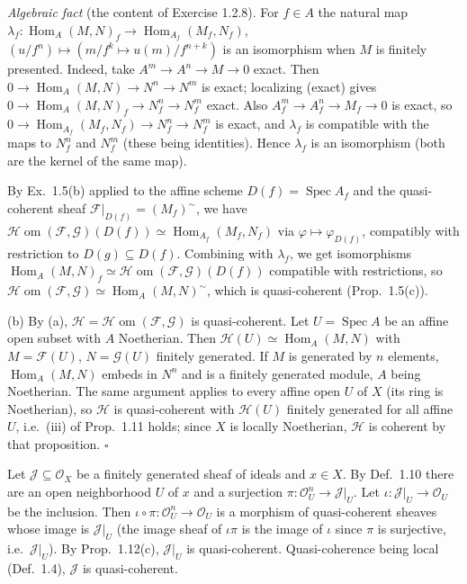 \documentclass[11pt]{article}
\begin{document}
\emph{Algebraic fact} (the content of Exercise 1.2.8). For $f\in A$ the natural map $\lambda_f:\operatorname{Hom}_A(M,N)_f\to\operatorname{Hom}_{A_f}(M_f,N_f)$, $(u/f^n)\mapsto(m/f^k\mapsto u(m)/f^{n+k})$ is an isomorphism when $M$ is finitely presented. Indeed, take $A^m\to A^n\to M\to0$ exact. Then $0\to\operatorname{Hom}_A(M,N)\to N^n\to N^m$ is exact; localizing (exact) gives $0\to\operatorname{Hom}_A(M,N)_f\to N_f^n\to N_f^m$ exact. Also $A_f^m\to A_f^n\to M_f\to0$ is exact, so $0\to\operatorname{Hom}_{A_f}(M_f,N_f)\to N_f^n\to N_f^m$ is exact, and $\lambda_f$ is compatible with the maps to $N_f^n$ and $N_f^m$ (these being identities). Hence $\lambda_f$ is an isomorphism (both are the kernel of the same map).

By Ex.~1.5(b) applied to the affine scheme $D(f)=\operatorname{Spec}A_f$ and the quasi-coherent sheaf $\mathcal{F}|_{D(f)}=(M_f)^\sim$, we have $\mathcal{H}\!\operatorname{om}(\mathcal{F},\mathcal{G})(D(f))\simeq\operatorname{Hom}_{A_f}(M_f,N_f)$ via $\varphi\mapsto\varphi_{D(f)}$, compatibly with restriction to $D(g)\subseteq D(f)$. Combining with $\lambda_f$, we get isomorphisms $\operatorname{Hom}_A(M,N)_f\simeq\mathcal{H}\!\operatorname{om}(\mathcal{F},\mathcal{G})(D(f))$ compatible with restrictions, so $\mathcal{H}\!\operatorname{om}(\mathcal{F},\mathcal{G})\simeq\operatorname{Hom}_A(M,N)^\sim$, which is quasi-coherent (Prop.~1.5(c)).

(b) By (a), $\mathcal{H}=\mathcal{H}\!\operatorname{om}(\mathcal{F},\mathcal{G})$ is quasi-coherent. Let $U=\operatorname{Spec}A$ be an affine open subset with $A$ Noetherian. Then $\mathcal{H}(U)\simeq\operatorname{Hom}_A(M,N)$ with $M=\mathcal{F}(U)$, $N=\mathcal{G}(U)$ finitely generated. If $M$ is generated by $n$ elements, $\operatorname{Hom}_A(M,N)$ embeds in $N^n$ and is a finitely generated module, $A$ being Noetherian. The same argument applies to every affine open $U$ of $X$ (its ring is Noetherian), so $\mathcal{H}$ is quasi-coherent with $\mathcal{H}(U)$ finitely generated for all affine $U$, i.e.\ (iii) of Prop.~1.11 holds; since $X$ is locally Noetherian, $\mathcal{H}$ is coherent by that proposition. \hfill$\square$

\pf
Let $\mathcal{J}\subseteq\mathcal{O}_X$ be a finitely generated sheaf of ideals and $x\in X$. By Def.~1.10 there are an open neighborhood $U$ of $x$ and a surjection $\pi:\mathcal{O}_U^n\to\mathcal{J}|_U$. Let $\iota:\mathcal{J}|_U\to\mathcal{O}_U$ be the inclusion. Then $\iota\circ\pi:\mathcal{O}_U^n\to\mathcal{O}_U$ is a morphism of quasi-coherent sheaves whose image is $\mathcal{J}|_U$ (the image sheaf of $\iota\pi$ is the image of $\iota$ since $\pi$ is surjective, i.e.\ $\mathcal{J}|_U$). By Prop.~1.12(c), $\mathcal{J}|_U$ is quasi-coherent. Quasi-coherence being local (Def.~1.4), $\mathcal{J}$ is quasi-coherent.
\end{document}
